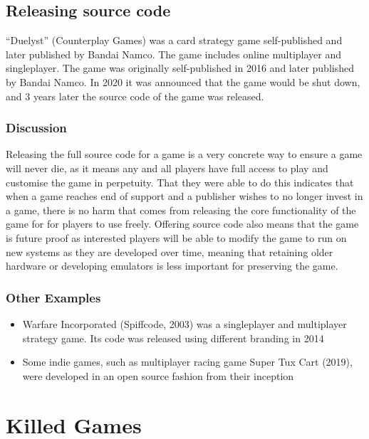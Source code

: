 \subsection{Releasing source code}
``Duelyst'' (Counterplay Games) was a card strategy game self-published and later published by Bandai Namco.
The game includes online multiplayer and singleplayer.
The game was originally self-published in 2016 and later published by Bandai Namco.
In 2020 it was announced that the game would be shut down,
and 3 years later the \gls{source} code of the game was released\cite{duelyst-2023}.

\subsubsection*{Discussion}
Releasing the full source code for a game is a very concrete way to ensure a game will never die, as it means any and all players have full access to play and customise the game in perpetuity.
That they were able to do this indicates that when a game reaches end of support and a publisher wishes to no longer invest in a game,
there is no harm that comes from releasing the core functionality of the game for for players to use freely.
Offering source code also means that the game is future proof as interested players will be able to modify the game to run on new systems as they are developed over time,
meaning that retaining older hardware or developing emulators is less important for preserving the game.

\subsubsection*{Other Examples}
\begin{itemize}
    \item Warfare Incorporated (Spiffcode, 2003) was a singleplayer and multiplayer strategy game. Its code was released using different branding in 2014\cite{spiffcode-2014}
    \item Some indie games, such as multiplayer racing game Super Tux Cart (2019), were developed in an open source fashion from their inception\cite{supertux-2019}
\end{itemize}

\section{Killed Games}

